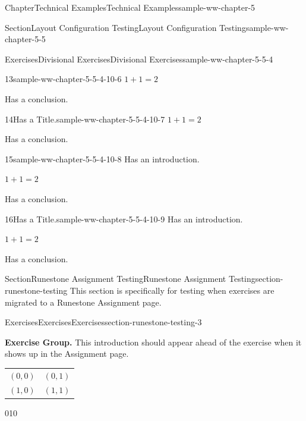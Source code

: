 \documentclass[oneside,10pt,]{book}
\newcommand{\tabularfont}{\relax}
\numberwithin{equation}{section}
\begin{document}
\begin{chapterptx}{Chapter}{Technical Examples}{}{Technical Examples}{}{}{sample-ww-chapter-5}
\begin{sectionptx}{Section}{Layout Configuration Testing}{}{Layout Configuration Testing}{}{}{sample-ww-chapter-5-5}
\begin{exercises-subsection}{Exercises}{Divisional Exercises}{}{Divisional Exercises}{}{}{sample-ww-chapter-5-5-4}
\begin{exercisegroup}
\begin{divisionexerciseeg}{13}{}{}{sample-ww-chapter-5-5-4-10-6}
\(1+1=2\)%
\par
Has a conclusion.%
\end{divisionexerciseeg}%
\begin{divisionexerciseeg}{14}{Has a Title.}{}{sample-ww-chapter-5-5-4-10-7}%
\(1+1=2\)%
\par
Has a conclusion.%
\end{divisionexerciseeg}%
\begin{divisionexerciseeg}{15}{}{}{sample-ww-chapter-5-5-4-10-8}%
Has an introduction.%
\par
\(1+1=2\)%
\par
Has a conclusion.%
\end{divisionexerciseeg}%
\begin{divisionexerciseeg}{16}{Has a Title.}{}{sample-ww-chapter-5-5-4-10-9}%
Has an introduction.%
\par
\(1+1=2\)%
\par
Has a conclusion.%
\end{divisionexerciseeg}%
\end{exercisegroup}
\par\medskip\noindent
\end{exercises-subsection}
\end{sectionptx}
%
%
\typeout{************************************************}
\typeout{************************************************}
%
\begin{sectionptx}{Section}{Runestone Assignment Testing}{}{Runestone Assignment Testing}{}{}{section-runestone-testing}
This section is specifically for testing when exercises are migrated to a Runestone Assignment page.%
%
%
\typeout{************************************************}
\typeout{************************************************}
%
\begin{exercises-subsection-numberless}{Exercises}{Exercises}{}{Exercises}{}{}{section-runestone-testing-3}
\par\medskip\noindent%
\textbf{Exercise Group.}\space\space%
This introduction should appear ahead of the exercise when it shows up in the Assignment page.%
\begin{center}%
{\tabularfont%
\begin{tabular}{ll}
\((0,0)\)&\((0,1)\)\tabularnewline[0pt]
\((1,0)\)&\((1,1)\)
\end{tabular}
}%
\end{center}%
\begin{image}{0}{1}{0}{}%
\resizebox{\linewidth}{!}{%
}
\end{image}
\end{exercises-subsection-numberless}
\end{sectionptx}
\end{chapterptx}
\end{document}
